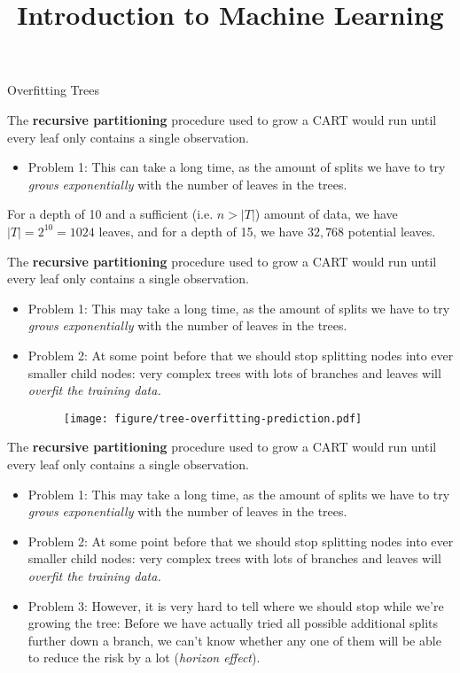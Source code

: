 \documentclass[11pt,compress,t,notes=noshow, xcolor=table]{beamer}
\title{Introduction to Machine Learning}
\institute{\href{https://compstat-lmu.github.io/lecture_i2ml/}{compstat-lmu.github.io/lecture\_i2ml}}
\date{}
\begin{document}
\sloppy

\begin{vbframe}{Overfitting Trees}

The \textbf{recursive partitioning} procedure used to grow a CART would run until every leaf only contains a single observation. 
\begin{itemize}
\item Problem 1: This can take a long time, as the amount of splits we have to try \emph{grows exponentially} with the number of leaves in the trees.
\end{itemize}

For a depth of 10 and a sufficient (i.e. $n > |T|$) amount of data, we have $|T| = 2^{10} = 1024$ leaves, and for a depth of 15, we have $32,768$ potential leaves.



\framebreak

The \textbf{recursive partitioning} procedure used to grow a CART would run until every leaf only contains a single observation. 
\begin{itemize}
\item Problem 1: This may take a long time, as the amount of splits we have to try \emph{grows exponentially} with the number of leaves in the trees.
\item Problem 2: At some point before that we should stop splitting nodes into ever smaller child nodes: very complex trees with lots of branches and leaves will \emph{overfit the training data.}

\begin{figure}
\centering
\texttt{[image: figure/tree-overfitting-prediction.pdf]}
\end{figure}

\end{itemize}

\framebreak

The \textbf{recursive partitioning} procedure used to grow a CART would run until every leaf only contains a single observation. 
\begin{itemize}
\item Problem 1: This may take a long time, as the amount of splits we have to try \emph{grows exponentially} with the number of leaves in the trees.
\item Problem 2: At some point before that we should stop splitting nodes into ever smaller child nodes: very complex trees with lots of branches and leaves will \emph{overfit the training data.}
\item Problem 3: However, it is very hard to tell where we should stop while we're growing the tree: Before we have actually tried all possible additional splits further down a branch, we can't know whether any one of them will be able to reduce the risk by a lot (\emph{horizon effect}).
\end{itemize}
\end{vbframe}
\end{document}

